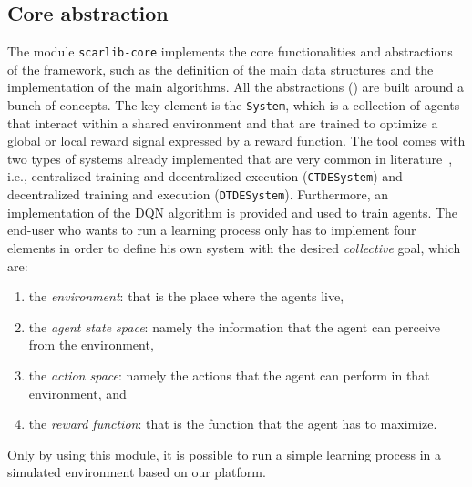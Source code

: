\subsection{Core abstraction} The module \texttt{scarlib-core} implements the core functionalities and abstractions of the framework, 
such as the definition of the main data structures and the implementation of the main algorithms. 
%
All the abstractions () are built around a bunch of concepts. 
 The key element is the \texttt{System}, 
 which is a collection of agents that interact within a shared environment and that are trained to optimize a global or local reward signal
expressed by a reward function. 
%
The tool comes with two types of systems already implemented that are very common in literature~\cite{Du2020},
i.e., centralized training and decentralized execution (\texttt{CTDESystem}) and decentralized training and execution (\texttt{DTDESystem}).
Furthermore, an implementation of the DQN algorithm \cite{Mnih2015} is provided and used to train agents. 
The end-user who wants to run a learning process only has to implement four elements
in order to define his own system with the desired \emph{collective} goal, which are:
\begin{enumerate}
    \item the \emph{environment}: that is the place where the agents live, 
    \item the \emph{agent state space}: namely the information that the agent can perceive from the environment, 
    \item the \emph{action space}: namely the actions that the agent can perform in that environment, and
    \item the \emph{reward function}: that is the function that the agent has to maximize.
\end{enumerate} 
Only by using this module, 
 it is possible to run a simple learning process in a simulated environment based on our platform.


